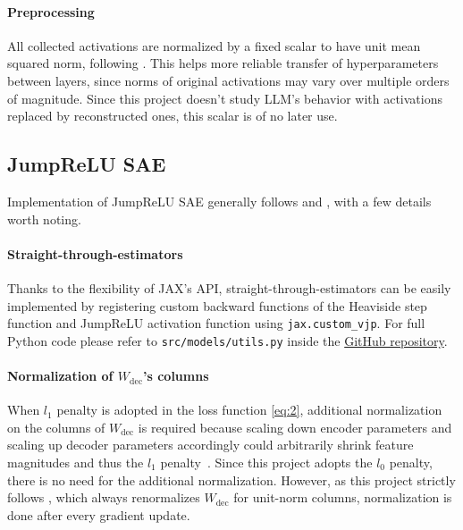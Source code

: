 \documentclass{article}
\newcommand\dec{\mathrm{dec}}
\begin{document}
\paragraph{Preprocessing}

All collected activations are normalized by a fixed scalar to have unit mean squared norm, following
\cite{lieberum2024Gemma}. This helps more reliable transfer of hyperparameters between layers, since
norms of original activations may vary over multiple orders of magnitude. Since this project doesn't
study LLM's behavior with activations replaced by reconstructed ones, this scalar is of no later
use.

\subsection{JumpReLU SAE}
\label{sec:jumprelu-sae}

Implementation of JumpReLU SAE generally follows \cite{rajamanoharan2024Jumping} and
\cite{lieberum2024Gemma}, with a few details worth noting.

\paragraph{Straight-through-estimators}

Thanks to the flexibility of JAX's API, straight-through-estimators can be easily implemented by
registering custom backward functions of the Heaviside step function and JumpReLU activation
function using \texttt{jax.custom\_vjp}. For full Python code please refer to
\texttt{src/models/utils.py} inside the \href{https://github.com/gzqaq/aiaa-5047-project}{GitHub
  repository}.

\paragraph{Normalization of \(W_{\dec}\)'s columns}

When \(l_1\) penalty is adopted in the loss function \eqref{eq:2}, additional normalization on the
columns of \(W_{\dec}\) is required because scaling down encoder parameters and scaling up decoder
parameters accordingly could arbitrarily shrink feature magnitudes and thus the \(l_1\)
penalty~\citep{rajamanoharan2024Jumping}. Since this project adopts the \(l_0\) penalty, there is no
need for the additional normalization. However, as this project strictly follows
\cite{lieberum2024Gemma}, which always renormalizes \(W_{\dec}\) for unit-norm columns,
normalization is done after every gradient update.
\end{document}
